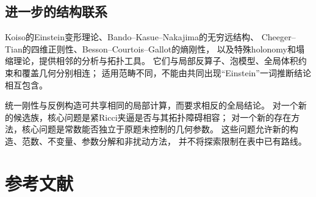\documentclass[11pt,a4paper]{article}
\theoremstyle{definition}
\begin{document}
\subsection{进一步的结构联系}
Koiso的Einstein变形理论、Bando--Kasue--Nakajima的无穷远结构、
Cheeger--Tian的四维正则性、Besson--Courtois--Gallot的熵刚性，
以及特殊holonomy和塌缩理论，提供相邻的分析与拓扑工具。
它们与局部反算子、泡模型、全局体积约束和覆盖几何分别相连；
适用范畴不同，不能由共同出现“Einstein”一词推断结论相互包含。

统一刚性与反例构造可共享相同的局部计算，而要求相反的全局结论。
对一个新的候选族，核心问题是紧Ricci夹逼是否与其拓扑障碍相容；
对一个新的存在方法，核心问题是常数能否独立于原题未控制的几何参数。
这些问题允许新的构造、范数、不变量、参数分解和非扰动方法，
并不将探索限制在表中已有路线。

\newpage
\section{参考文献}
\end{document}

